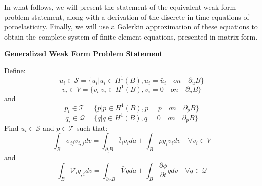 \documentclass[11pt]{article} %
\begin{document}
In what follows, we will present the statement of the equivalent weak form problem statement, along with a derivation of the discrete-in-time equations of poroelasticity. Finally, we will use a Galerkin approximation of these equations to obtain the complete system of finite element equations, presented in matrix form.

\begin{center} \textbf{Generalized Weak Form Problem Statement} \end{center}
Define:
\begin{equation}
	u_i \in \mathcal{S} = \{ u_i | u_i \in H^1 (B), u_i = \bar{u}_i \quad on \quad \partial_u B \}
\end{equation}
\begin{equation}
	v_i \in V = \{ v_i | v_i \in H^1 (B), v_i = 0 \quad on \quad \partial_u B \}
\end{equation}
and
\begin{equation}
	p_i \in \mathcal{T} = \{ p | p \in H^1 (B), p = \bar{p} \quad on \quad \partial_p B \}
\end{equation}
\begin{equation}
	q_i \in \mathcal{Q} = \{  q | q \in H^1 (B), q = 0 \quad on \quad \partial_p B \}
\end{equation}
Find $u_i \in \mathcal{S}$ and $p \in \mathcal{T}$ such that:
\begin{equation}
	\int_B \sigma_{ij} v_{i,j} dv = \int_{\partial_t B} \bar{t}_i v_i da + \int_B \rho g_i v_i dv \quad \forall v_i \in V
\end{equation}
and
\begin{equation}
	\int_B \mathcal{V}_i q_{,i} dv = \int_{\partial_{\mathcal{V}} B} \bar{\mathcal{V}} q da + \int_B \frac{\partial \phi}{\partial t} q dv \quad \forall q \in \mathcal{Q}
\end{equation}
\end{document}
